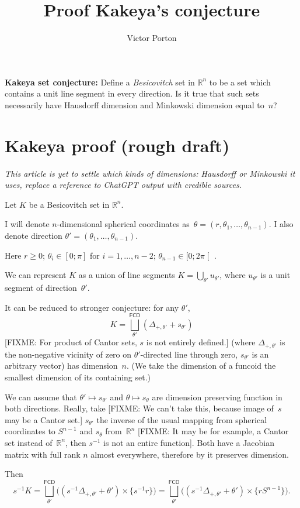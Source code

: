 \documentclass{amsart}
\title{Proof Kakeya's conjecture}
\author{Victor Porton}
\newcommand{\funcoids}{\mathsf{FCD}}
\begin{document}
\textbf{Kakeya set conjecture:} Define a \emph{Besicovitch} set in $\mathbb{R}^n$ to be a set which contains a unit line segment in every direction. Is it true that such sets necessarily have Hausdorff dimension and Minkowski dimension equal to~$n$?

\section{Kakeya proof (rough draft)}

\emph{This article is yet to settle which kinds of dimensions: Hausdorff or Minkowski it uses, replace a reference to ChatGPT output with credible sources.}

Let $K$ be a Besicovitch set in $\mathbb{R}^n$.

I will denote $n$-dimensional spherical coordinates as~$\theta=(r, \theta_1,\dots,\theta_{n-1})$.
I also denote direction $\theta'=(\theta_1,\dots,\theta_{n-1})$.

Here $r\geq 0$; $\theta_i\in[0;\pi]$ for $i=1,\dots,n-2$; $\theta_{n-1}\in[0;2\pi\mathclose[$ .

We can represent $K$ as a union of line segments $K = \bigcup_{\theta'} u_{\theta'}$, where $u_{\theta'}$ is a unit segment of direction~$\theta'$.

It can be reduced to stronger conjecture: for any $\theta'$, \[ K = \bigsqcup^{\funcoids}_{\theta'} (\Delta_{+,\theta'}+s_{\theta'}) \] 
[FIXME: For product of Cantor sets, $s$ is not entirely defined.]
(where $\Delta_{+,\theta'}$ is the non-ne\-ga\-ti\-ve vicinity of zero on $\theta'$-di\-rec\-ted line through zero, $s_{\theta'}$ is an arbitrary vector) has dimension~$n$. (We take the dimension of a funcoid the smallest dimension of its containing set.)

We can assume that $\theta'\mapsto s_{\theta'}$ and $\theta\mapsto s_{\theta}$ are dimension preserving function in both directions. Really,
take [FIXME: We can't take this, because image of~$s$ may be a Cantor set.] $s_{\theta'}$ the inverse of the usual mapping from spherical coordinates to $S^{n-1}$ and $s_{\theta}$ from~$\mathbb{R}^n$ [FIXME: It may be for example, a Cantor set instead of~$\mathbb{R}^n$, then $s^{-1}$ is not an entire function]. Both have
a Jacobian matrix with full rank $n$ almost everywhere, therefore by \cite{gpt-preserve-dim} it preserves dimension.

Then \[ s^{-1}K = \bigsqcup^{\funcoids}_{\theta'} \bigl((s^{-1}\Delta_{+,\theta'}+\theta')\times\{s^{-1}r\}\bigr) =
\bigsqcup^{\funcoids}_{\theta'} \bigl((s^{-1}\Delta_{+,\theta'}+\theta')\times\{rS^{n-1}\}\bigr). \]
\end{document}
